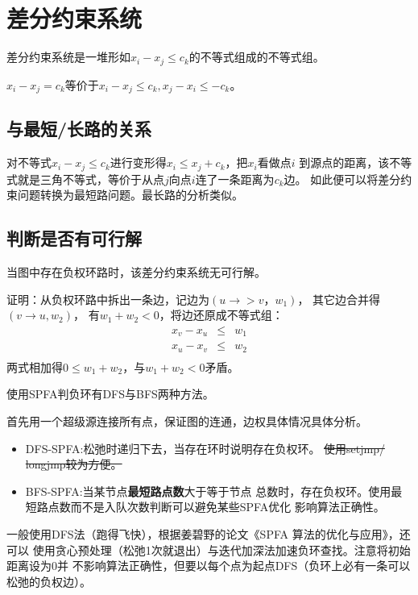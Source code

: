 \section{差分约束系统}
差分约束系统是一堆形如$x_i-x_j\leq c_k$的不等式组成的不等式组。

$x_i-x_j=c_k$等价于$x_i-x_j\leq c_k,x_j-x_i\leq -c_k$。

\subsection{与最短/长路的关系}
对不等式$x_i-x_j\leq c_k$进行变形得$x_i\leq x_j+c_k$，把$x_i$看做点$i$
到源点的距离，该不等式就是三角不等式，等价于从点$j$向点$i$连了一条距离为$c_k$边。
如此便可以将差分约束问题转换为最短路问题。最长路的分析类似。

\subsection{判断是否有可行解}

\begin{theorem}
    当图中存在负权环路时，该差分约束系统无可行解。
\end{theorem}

证明：从负权环路中拆出一条边，记边为$(u\rightarrow >v，w_1)$，
其它边合并得$(v\rightarrow u,w_2)$，
有$w_1+w_2<0$，将边还原成不等式组：
\begin{eqnarray*}
    x_v-x_u&\leq& w_1\\
    x_u-x_v&\leq& w_2\\
\end{eqnarray*}
两式相加得$0\leq w_1+w_2$，与$w_1+w_2<0$矛盾。

使用SPFA判负环有DFS与BFS两种方法。

首先用一个超级源连接所有点，保证图的连通，边权具体情况具体分析。

\begin{itemize}
    \item DFS-SPFA:松弛时递归下去，当存在环时说明存在负权环。
    \sout{使用setjmp/\\longjmp较为方便。}
    \item BFS-SPFA:当某节点{\bfseries 最短路点数}大于等于节点
    总数时，存在负权环。使用最短路点数而不是入队次数判断可以避免某些SPFA优化
    影响算法正确性。
\end{itemize}
一般使用DFS法（跑得飞快），根据姜碧野的论文《SPFA 算法的优化与应用》，还可以
使用贪心预处理（松弛1次就退出）与迭代加深法加速负环查找。注意将初始距离设为0并
不影响算法正确性，但要以每个点为起点DFS（负环上必有一条可以松弛的负权边）。


